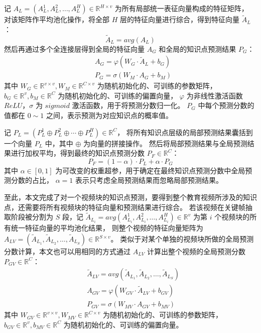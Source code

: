     记 $A_L = \left(A_L^1, A_L^2, \dots, A_L^H\right) \in \mathbb{R}^{H \times v}$ 为所有局部统一表征向量构成的特征矩阵，
    对该矩阵作平均池化操作，将全部 $H$ 层的特征向量进行综合，得到特征向量 $\tilde{A}_L$：
    \begin{equation}
        \tilde{A}_L = avg\left(A_L\right)
    \end{equation}
    然后再通过多个全连接层得到全局的特征向量 $A_G$ 和全局的知识点预测结果 $P_G$：
    \begin{equation}
        \begin{aligned}
            &A_G = \varphi\left(W_G \cdot \tilde{A}_L + b_G\right) \\
            &P_G = \sigma\left(W_M \cdot A_G + b_M\right)
        \end{aligned}
    \end{equation}
    其中 $W_G \in \mathbb{R}^{v \times v}, W_M \in \mathbb{R}^{C \times v}$ 为随机初始化的、可训练的参数矩阵，
    $b_G \in \mathbb{R}^{v}, b_M \in \mathbb{R}^{C}$ 为随机初始化的、可训练的偏置向量，
    $\varphi$ 为非线性激活函数 $ReLU$，$\sigma$ 为 $sigmoid$ 激活函数，用于将预测分数归一化。
    $P_G$ 中每个预测分数的值都在 $0 \sim 1$ 之间，表示预测为对应知识点的概率值。

    记 $P_L = \left(P_L^1 \oplus P_L^2 \oplus \cdots \oplus P_L^H\right) \in \mathbb{R}^{C}$，
    将所有知识点层级的局部预测结果囊括到一个向量 $P_L$ 中，其中 $\oplus$ 为向量的拼接操作。
    然后将局部预测结果与全局预测结果进行加权平均，得到最终的知识点预测分数 $P_F \in \mathbb{R}^{C}$：
    \begin{equation}
        P_F = (1 - \alpha) \cdot P_L + \alpha \cdot P_G
    \end{equation}
    其中 $\alpha \in [0, 1]$ 为可改变的权重超参，用于确定在最终知识点预测分数中全局预测分数的占比，
    $\alpha = 1$ 表示只考虑全局预测结果而忽略局部预测结果。

    至此，本文完成了对一个视频块的知识点预测，要得到整个教育视频所涉及的知识点，还需要将所有视频块的特征向量和预测结果进行综合。
    若该视频在关键帧抽取阶段被分割为 $S$ 段，记 $\tilde{A}_{L_i} = avg\left(A_{L_i}^1, A_{L_i}^2, \dots, A_{L_i}^H\right) \in \mathbb{R}^{v}$ 为第 $i$ 个视频块的所有统一特征向量的平均池化结果，
    则整个视频的特征向量矩阵为 $A_{LV} = \left(\tilde{A}_{L_1}, \tilde{A}_{L_2}, \dots, \tilde{A}_{L_S}\right) \in \mathbb{R}^{S \times v}$。
    类似于对某个单独的视频块所做的全局预测分数计算，本文也可以用相同的方式通过 $A_{LV}$ 计算出整个视频的全局预测分数 $P_{GV} \in \mathbb{R}^{C}$：
    \begin{equation}
        \begin{aligned}
            &\tilde{A}_{LV} = avg\left(\tilde{A}_{L_1}, \tilde{A}_{L_2}, \dots, \tilde{A}_{L_S}\right) \\
            &A_{GV} = \varphi\left(W_{GV} \cdot \tilde{A}_{LV} + b_{GV}\right) \\
            &P_{GV} = \sigma\left(W_{MV} \cdot A_{GV} + b_{MV}\right)
        \end{aligned}
    \end{equation}
    其中 $W_{GV} \in \mathbb{R}^{v \times v}, W_{MV} \in \mathbb{R}^{C \times v}$ 为随机初始化的、可训练的参数矩阵，
    $b_{GV} \in \mathbb{R}^{v}, b_{MV} \in \mathbb{R}^{C}$ 为随机初始化的、可训练的偏置向量。


